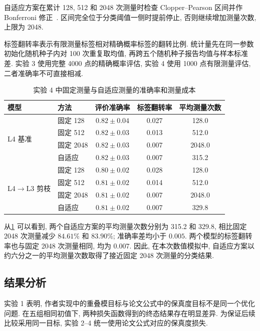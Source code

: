 \documentclass[a4paper]{ctexart}
\begin{document}
自适应方案在累计 128, 512 和 2048 次测量时检查 Clopper--Pearson 区间并作 Bonferroni 修正~\cite{clopper1934}. 区间完全位于分类阈值一侧时提前停止, 否则继续增加测量次数, 上限为 2048.

标签翻转率表示有限测量标签相对精确概率标签的翻转比例. 统计量先在同一参数初始化随机种子内对 100 次重复取均值, 再跨五个随机种子报告均值与样本标准差. 实验 3 使用完整 4000 点的精确概率评估, 实验 4 使用 1000 点有限测量评估, 二者准确率不可直接相减.

\begin{table}[H]
    \centering
    \caption{实验 4 中固定测量与自适应测量的准确率和测量成本}
    \label{tab:m4-shot-summary}
    \renewcommand{\arraystretch}{1.2}
    \begin{tabular*}{\textwidth}{@{\extracolsep{\fill}}llccc@{}}
        \toprule
        模型 & 方法 & 评价准确率 & 标签翻转率 & 平均测量次数 \\
        \midrule
        \multirow{4}{*}{L4 基准}
        & 固定 128  & $0.82\pm0.04$ & 0.027 & 128.0 \\
        & 固定 512  & $0.82\pm0.03$ & 0.013 & 512.0 \\
        & 固定 2048 & $0.82\pm0.03$ & 0.007 & 2048.0 \\
        & 自适应    & $0.82\pm0.03$ & 0.007 & 315.2 \\
        \midrule
        \multirow{4}{*}{L4$\to$L3 剪枝}
        & 固定 128  & $0.80\pm0.02$ & 0.028 & 128.0 \\
        & 固定 512  & $0.81\pm0.02$ & 0.014 & 512.0 \\
        & 固定 2048 & $0.81\pm0.02$ & 0.007 & 2048.0 \\
        & 自适应    & $0.81\pm0.02$ & 0.007 & 329.8 \\
        \bottomrule
    \end{tabular*}
\end{table}

从\cref{tab:m4-shot-summary} 可以看到, 两个自适应方案的平均测量次数分别为 315.2 和 329.8, 相比固定 2048 次测量减少 $84.61\%$ 和 $83.90\%$; 准确率差均小于 $0.005$. 两个模型的标签翻转率也与固定 2048 次测量相同, 均为 $0.007$. 因此, 在本次数值模拟中, 自适应方案以约六分之一的平均测量次数取得了接近固定 2048 次测量的分类结果.

\subsection{结果分析}

实验 1 表明, 作者实现中的重叠模目标与论文公式中的保真度目标不是同一个优化问题. 在五组相同初值下, 两种损失函数得到的终态结果存在明显差异. 为保证后续比较采用同一目标, 实验 2--4 统一使用论文公式对应的保真度损失.
\end{document}
